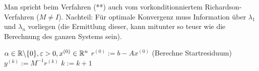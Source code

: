  \begin{bemerkung}
 Man spricht beim Verfahren (**) auch vom vorkonditionniertem Richardson-Verfahren ($M\neq I$). 
 Nachteil: Für optimale Konvergenz muss Information über $\lambda_1$ und $\lambda_n$ vorliegen (die Ermittlung dieser, kann mitunter so teuer wie die Berechnung des ganzen Systems sein).
 \end{bemerkung}

 \begin{algorithmus}
   \begin{algorithmic}[1]
     \Statex 
     \Statex{} 
     \Comment $\alpha\in\mathbb{R} \backslash \{0\}, \varepsilon >0, x^{(0)}\in \mathbb{R}^n$
     \Statex
     \State  $r^{(0)} := b-Ax^{(0)}$ (Berechne Startresiduum)
      \State $y^{(k)} := M^{-1} r^{(k)}$
      \State $k:=k+1$
     \EndWhile  
     \EndProcedure
   \end{algorithmic}
 \end{algorithmus}

